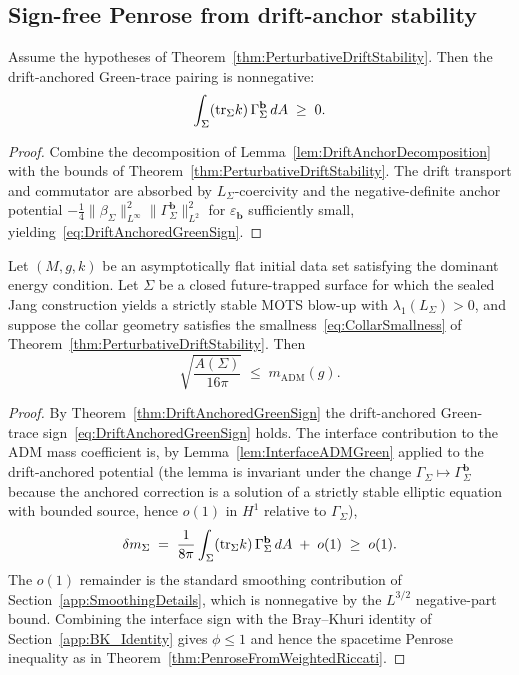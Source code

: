\subsection{Sign-free Penrose from drift-anchor stability}

\begin{theorem}\label{thm:DriftAnchoredGreenSign}
Assume the hypotheses of Theorem~\ref{thm:PerturbativeDriftStability}. Then the drift-anchored Green-trace pairing is nonnegative:
\begin{equation}\label{eq:DriftAnchoredGreenSign}
    \int_\Sigma(\mathrm{tr}_\Sigma k)\,\Gamma_\Sigma^{\mathbf b}\,dA\;\ge\;0 .
\end{equation}
\end{theorem}

\begin{proof}
Combine the decomposition of Lemma~\ref{lem:DriftAnchorDecomposition} with the bounds of Theorem~\ref{thm:PerturbativeDriftStability}. The drift transport and commutator are absorbed by $L_\Sigma$-coercivity and the negative-definite anchor potential $-\tfrac14\|\beta_\Sigma\|_{L^\infty}^2\|\Gamma_\Sigma^{\mathbf b}\|_{L^2}^2$ for $\varepsilon_{\mathbf b}$ sufficiently small, yielding~\eqref{eq:DriftAnchoredGreenSign}.
\end{proof}

\begin{theorem}\label{thm:PenroseDriftAnchor}
Let $(M,g,k)$ be an asymptotically flat initial data set satisfying the dominant energy condition. Let $\Sigma$ be a closed future-trapped surface for which the sealed Jang construction yields a strictly stable MOTS blow-up with $\lambda_1(L_\Sigma)>0$, and suppose the collar geometry satisfies the smallness~\eqref{eq:CollarSmallness} of Theorem~\ref{thm:PerturbativeDriftStability}. Then
\[
    \sqrt{\frac{A(\Sigma)}{16\pi}}\;\le\;m_{\mathrm{ADM}}(g) .
\]
\end{theorem}

\begin{proof}
By Theorem~\ref{thm:DriftAnchoredGreenSign} the drift-anchored Green-trace sign~\eqref{eq:DriftAnchoredGreenSign} holds. The interface contribution to the ADM mass coefficient is, by Lemma~\ref{lem:InterfaceADMGreen} applied to the drift-anchored potential (the lemma is invariant under the change $\Gamma_\Sigma\mapsto\Gamma_\Sigma^{\mathbf b}$ because the anchored correction is a solution of a strictly stable elliptic equation with bounded source, hence $o(1)$ in $H^1$ relative to $\Gamma_\Sigma$),
\[
    \delta m_\Sigma\;=\;\frac1{8\pi}\int_\Sigma(\mathrm{tr}_\Sigma k)\,\Gamma_\Sigma^{\mathbf b}\,dA\;+\;o(1)\;\ge\;o(1).
\]
The $o(1)$ remainder is the standard smoothing contribution of Section~\ref{app:SmoothingDetails}, which is nonnegative by the $L^{3/2}$ negative-part bound. Combining the interface sign with the Bray--Khuri identity of Section~\ref{app:BK_Identity} gives $\phi\le1$ and hence the spacetime Penrose inequality as in Theorem~\ref{thm:PenroseFromWeightedRiccati}.
\end{proof}


